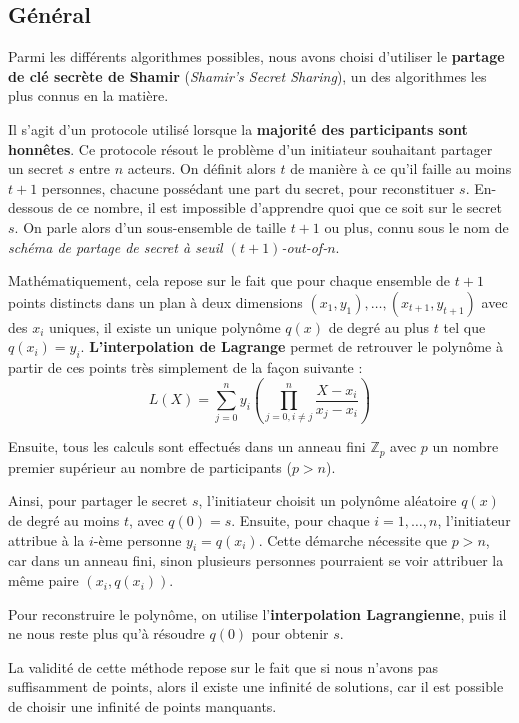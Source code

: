 \documentclass[12pt,a4paper]{article}
\begin{document}
\subsection{Général}
Parmi les différents algorithmes possibles, nous avons choisi d'utiliser le \textbf{partage de clé secrète de Shamir} (\textit{Shamir's Secret Sharing}), un des algorithmes les plus connus en la matière.

Il s'agit d'un protocole utilisé lorsque la \textbf{majorité des participants sont honnêtes}. Ce protocole résout le problème d'un initiateur souhaitant partager un secret \( s \) entre \( n \) acteurs. On définit alors \( t \) de manière à ce qu'il faille au moins \( t + 1 \) personnes, chacune possédant une part du secret, pour reconstituer \( s \). En-dessous de ce nombre, il est impossible d'apprendre quoi que ce soit sur le secret \( s \). On parle alors d'un sous-ensemble de taille \( t + 1 \) ou plus, connu sous le nom de \textit{schéma de partage de secret à seuil \((t+1)\)-out-of-\(n\)}.

Mathématiquement, cela repose sur le fait que pour chaque ensemble de \( t + 1 \) points distincts dans un plan à deux dimensions \((x_1, y_1), \ldots, (x_{t+1}, y_{t+1})\) avec des \( x_i \) uniques, il existe un unique polynôme \( q(x) \) de degré au plus \( t \) tel que \( q(x_i) = y_i \). \textbf{L'interpolation de Lagrange} permet de retrouver le polynôme à partir de ces points très simplement de la façon suivante :
\[ L(X)=\sum_{j=0}^{n}y_i(\prod_{j=0,i\neq j}^n \frac{X - x_i}{x_j - x_i}) \]

Ensuite, tous les calculs sont effectués dans un anneau fini \( \mathbb Z_p \) avec \( p \) un nombre premier supérieur au nombre de participants (\( p > n \)).

Ainsi, pour partager le secret \( s \), l'initiateur choisit un polynôme aléatoire \( q(x) \) de degré au moins \( t \), avec \( q(0) = s \). Ensuite, pour chaque \( i = 1, \ldots, n \), l'initiateur attribue à la \( i \)-ème personne \( y_i = q(x_i) \). Cette démarche nécessite que \( p > n \), car dans un anneau fini, sinon plusieurs personnes pourraient se voir attribuer la même paire \( (x_i, q(x_i)) \).

Pour reconstruire le polynôme, on utilise l'\textbf{interpolation Lagrangienne}, puis il ne nous reste plus qu'à résoudre \( q(0) \) pour obtenir \( s \). 

La validité de cette méthode repose sur le fait que si nous n'avons pas suffisamment de points, alors il existe une infinité de solutions, car il est possible de choisir une infinité de points manquants.
\end{document}
